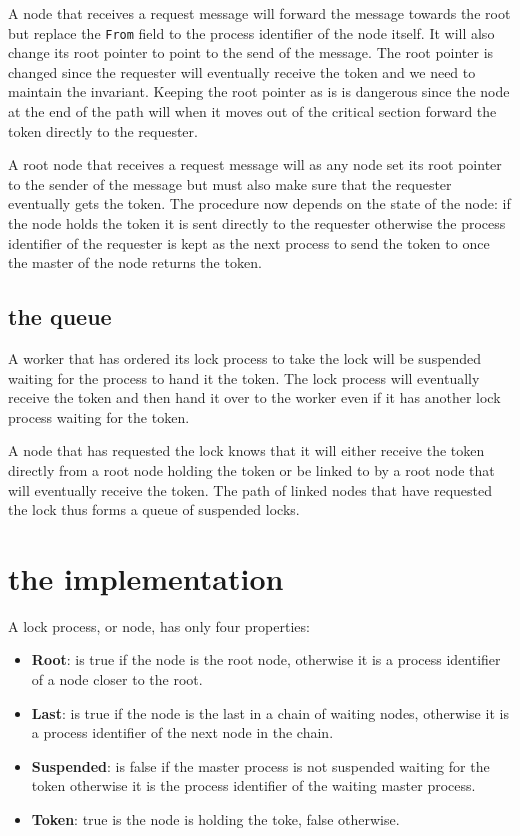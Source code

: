 \documentclass[a4paper, 11pt]{article}
\begin{document}
A node that receives a request message will forward the message
towards the root but replace the {\tt From} field to the process
identifier of the node itself. It will also change its root pointer to
point to the send of the message. The root pointer is changed since
the requester will eventually receive the token and we need to
maintain the invariant. Keeping the root pointer as is is dangerous
since the node at the end of the path will when it moves out of the
critical section forward the token directly to the requester. 

A root node that receives a request message will as any node set its
root pointer to the sender of the message but must also make sure that
the requester eventually gets the token. The procedure now depends on
the state of the node: if the node holds the token it is sent directly
to the requester otherwise the process identifier of the requester is
kept as the next process to send the token to once the master of the
node returns the token.

\subsection{the queue}

A worker that has ordered its lock process to take the lock will be
suspended waiting for the process to hand it the token. The lock
process will eventually receive the token and then hand it over to the
worker even if it has another lock process waiting for the token. 

A node that has requested the lock knows that it will either receive
the token directly from a root node holding the token or be linked to
by a root node that will eventually receive the token. The path of
linked nodes that have requested the lock thus forms a queue of
suspended locks. 


\section{the implementation}


A lock process, or node, has only four properties: 

\begin{itemize}

\item {\bf Root}: is true if the node is the root node, otherwise it is a
 process identifier of a node closer to the root.

\item {\bf Last}: is true if the node is the last in a chain of
  waiting nodes, otherwise it is a process identifier of the next node
  in the chain.

\item {\bf Suspended}: is false if the master process is not suspended
  waiting for the token otherwise it is the process identifier of the
  waiting master process.

\item {\bf Token}: true is the node is holding the toke, false otherwise.

\end{itemize}
\end{document}
